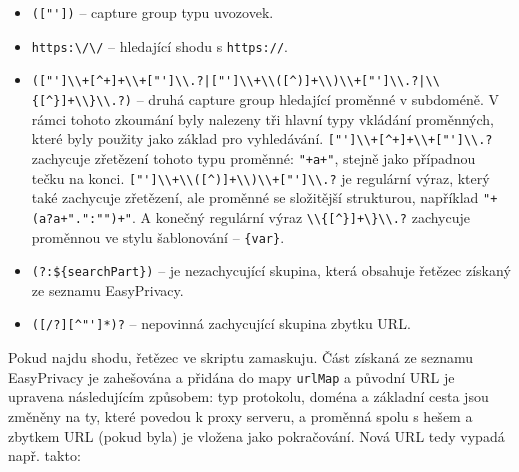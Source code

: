 \begin{itemize}
    \item \verb|(["'])|  -- capture group typu uvozovek.
    \item \verb|https:\/\/| -- hledající shodu s \texttt{https://}.
    \item \verb!(["']\\+[^+]+\\+["']\\.?|["']\\+\\([^)]+\\)\\+["']\\.?|\\{[^}]+\\}\\.?)! -- druhá capture group hledající proměnné v subdoméně. V rámci tohoto zkoumání byly nalezeny tři hlavní typy vkládání proměnných, které byly použity jako základ pro vyhledávání. \verb!["']\\+[^+]+\\+["']\\.?! zachycuje zřetězení tohoto typu proměnné: \texttt{"+a+"}, stejně jako případnou tečku na konci. \verb!["']\\+\\([^)]+\\)\\+["']\\.?! je regulární výraz, který také zachycuje zřetězení, ale proměnné se složitější strukturou, například \texttt{"+(a?a+".":"")+"}. A konečný regulární výraz \verb!\\{[^}]+\}\\.?! zachycuje proměnnou ve stylu šablonování -- \verb|{var}|. 
    \item \verb!(?:${searchPart})! -- je nezachycující skupina, která obsahuje řetězec získaný ze seznamu EasyPrivacy.
    \item \verb!([/?][^"']*)?! -- nepovinná zachycující skupina zbytku URL. 
\end{itemize}

Pokud najdu shodu, řetězec ve skriptu zamaskuju. Část získaná ze seznamu EasyPrivacy je zahešována a přidána do mapy \texttt{urlMap} a původní URL je upravena následujícím způsobem: typ protokolu, doména a základní cesta jsou změněny na ty, které povedou k proxy serveru, a proměnná spolu s hešem a zbytkem URL (pokud byla) je vložena jako pokračování. Nová URL tedy vypadá např. takto:

